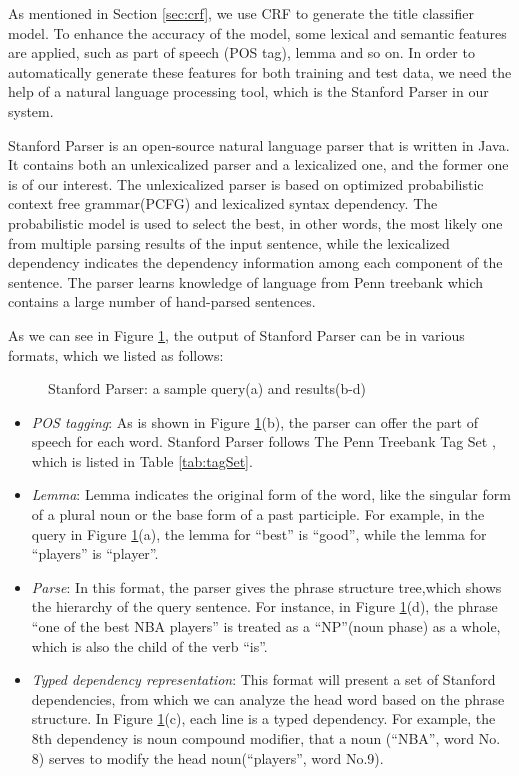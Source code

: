 As mentioned in Section \ref{sec:crf}, we use CRF to generate the title classifier model.
To enhance the accuracy of the model, some lexical and semantic features are applied,
such as part of speech (POS tag), lemma and so on.
In order to automatically generate these features for both training and test data,
we need the help of a natural language processing tool,
which is the Stanford Parser in our system.

Stanford Parser is an open-source natural language parser that is written in Java.
It contains both an unlexicalized parser and a lexicalized one,
and the former one is of our interest.
The unlexicalized parser is based on optimized probabilistic context free grammar(PCFG) and lexicalized syntax dependency.
The probabilistic model is used to select the best, in other words, the most likely one from multiple parsing results of the input sentence,
while the lexicalized dependency indicates the dependency information among each component of the sentence.
The parser learns knowledge of language from Penn treebank\cite{marcus1993building}
which contains a large number of hand-parsed sentences.

As we can see in Figure \ref{fig:parserRes},
the output of Stanford Parser can be in various formats,
which we listed as follows:

\begin{figure}[th]
        \centering
        \caption{Stanford Parser: a sample query(a) and results(b-d)}
        \label{fig:parserRes}
\end{figure}

\begin{itemize}
  \item \textit{POS tagging}:
  As is shown in Figure \ref{fig:parserRes}(b), the parser can offer the part of speech for each word.
  Stanford Parser follows The Penn Treebank Tag Set \cite{PennTreeBankTagSet}, which is listed in Table \ref{tab:tagSet}.
  \item \textit{Lemma}:
  Lemma indicates the original form of the word, like the singular form of a plural noun or
  the base form of a past participle. For example, in the query in Figure \ref{fig:parserRes}(a), the lemma for ``best'' is ``good'',
  while the lemma for ``players'' is ``player''.
  \item \textit{Parse}:
  In this format, the parser gives the phrase structure tree,which shows the hierarchy of the query sentence.
  For instance, in Figure \ref{fig:parserRes}(d), the phrase ``one of the best NBA players'' is treated as a ``NP''(noun phase) as a whole,
  which is also the child of the verb ``is''.
  \item \textit{Typed dependency representation}:
  This format will present a set of Stanford dependencies, from which we can analyze the head word based on the phrase structure.
  In Figure \ref{fig:parserRes}(c), each line is a typed dependency.
  For example, the 8th dependency is noun compound modifier, that a noun (``NBA'', word No. 8) serves to modify the head noun(``players'', word No.9).
\end{itemize}

